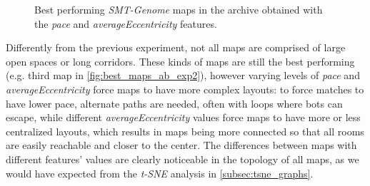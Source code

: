 \begin{figure}[p]
{    }
    \qquad
    \caption{Best performing \textit{SMT-Genome} maps in the archive obtained with the \textit{pace} and \textit{averageEccentricity} features.}
    \label{fig:best_maps_smt_exp2}
\end{figure}

\clearpage
Differently from the previous experiment, not all maps are comprised of large open spaces or long corridors. These kinds of maps are still the best performing (e.g. third map in \ref{fig:best_maps_ab_exp2}), however varying levels of \textit{pace} and \textit{averageEccentricity} force maps to have more complex layouts: to force matches to have lower pace, alternate paths are needed, often with loops where bots can escape, while different \textit{averageEccentricity} values force maps to have more or less centralized layouts, which results in maps being more connected so that all rooms are easily reachable and closer to the center. The differences between maps with different features' values are clearly noticeable in the topology of all maps, as we would have expected from the \textit{t-SNE} analysis in \cref{subsec:tsne_graphs}.

